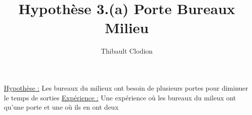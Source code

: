 \documentclass[12pt]{article}
\title{Hypothèse 3.(a) Porte Bureaux Milieu}
\author{Thibault Clodion}
\begin{document}
\maketitle %

\underline{Hypothèse :} Les bureaux du milieux ont besoin de plusieurs portes pour diminuer le temps de sorties
\newline\newline
\underline{Expérience :} Une expérience où les bureaux du mileux ont qu'une porte et une où ils en ont deux
\newline\newline
\end{document}
